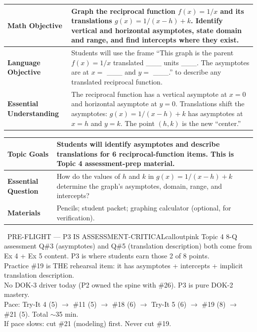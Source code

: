 \documentclass[11pt]{article}
\begin{document}

{\small
\renewcommand{\arraystretch}{1.25}
\noindent\begin{tabular}{|p{1.8in}|p{4.8in}|}
\hline
\textbf{Math Objective} & Graph the reciprocal function \(f(x) = 1/x\) and its translations \(g(x) = 1/(x-h) + k\). Identify vertical and horizontal asymptotes, state domain and range, and find intercepts where they exist. \\ \hline
\textbf{Language Objective} & Students will use the frame ``This graph is the parent \(f(x) = 1/x\) translated \_\_\_ units \_\_\_. The asymptotes are at \(x =\) \_\_\_ and \(y =\) \_\_\_.'' to describe any translated reciprocal function. \\ \hline
\textbf{Essential Understanding} & The reciprocal function has a vertical asymptote at \(x = 0\) and horizontal asymptote at \(y = 0\). Translations shift the asymptotes: \(g(x) = 1/(x-h) + k\) has asymptotes at \(x = h\) and \(y = k\). The point \((h, k)\) is the new ``center.'' \\ \hline
\end{tabular}
}

{\small
\renewcommand{\arraystretch}{1.25}
\noindent\begin{tabular}{|p{1.8in}|p{4.8in}|}
\hline
\textbf{Topic Goals} & Students will identify asymptotes and describe translations for 6 reciprocal-function items. This is Topic 4 assessment-prep material. \\ \hline
\textbf{Essential Question} & How do the values of \(h\) and \(k\) in \(g(x) = 1/(x-h) + k\) determine the graph's asymptotes, domain, range, and intercepts? \\ \hline
\textbf{Materials} & Pencils; student packet; graphing calculator (optional, for verification). \\ \hline
\end{tabular}
}

\begin{callout}{\IconPin\ PRE-FLIGHT --- P3 IS ASSESSMENT-CRITICAL}{calloutpink}
Topic 4 8-Q assessment Q\#3 (asymptotes) and Q\#5 (translation description) both come from Ex 4 + Ex 5 content. P3 is where students earn those 2 of 8 points.\\
Practice \#19 is THE rehearsal item: it has asymptotes + intercepts + implicit translation description.\\
No DOK-3 driver today (P2 owned the spine with \#26). P3 is pure DOK-2 mastery.\\
Pace: Try-It 4 (5) \(\rightarrow\) \#11 (5) \(\rightarrow\) \#18 (6) \(\rightarrow\) Try-It 5 (6) \(\rightarrow\) \#19 (8) \(\rightarrow\) \#21 (5). Total \(\sim\)35 min.\\
If pace slows: cut \#21 (modeling) first. Never cut \#19.
\end{callout}
\end{document}
